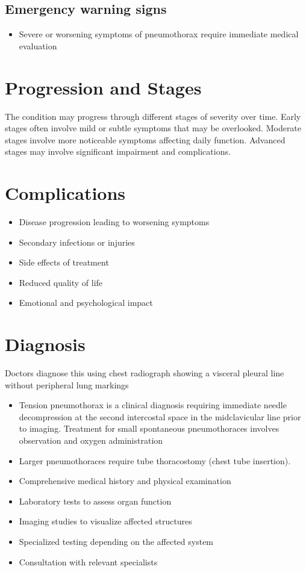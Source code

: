 \subsection{Emergency warning signs}
\begin{itemize}[noitemsep]
  \item Severe or worsening symptoms of pneumothorax require immediate medical evaluation
\end{itemize}
\section{Progression and Stages}
The condition may progress through different stages of severity over time. Early stages often involve mild or subtle symptoms that may be overlooked. Moderate stages involve more noticeable symptoms affecting daily function. Advanced stages may involve significant impairment and complications.
\section{Complications}
\begin{itemize}[noitemsep]
  \item Disease progression leading to worsening symptoms
  \item Secondary infections or injuries
  \item Side effects of treatment
  \item Reduced quality of life
  \item Emotional and psychological impact
\end{itemize}
\section{Diagnosis}
Doctors diagnose this using chest radiograph showing a visceral pleural line without peripheral lung markings

\begin{itemize}[noitemsep]
  \item Tension pneumothorax is a clinical diagnosis requiring immediate needle decompression at the second intercostal space in the midclavicular line prior to imaging. Treatment for small spontaneous pneumothoraces involves observation and oxygen administration
  \item Larger pneumothoraces require tube thoracostomy (chest tube insertion).
  \item Comprehensive medical history and physical examination
  \item Laboratory tests to assess organ function
  \item Imaging studies to visualize affected structures
  \item Specialized testing depending on the affected system
  \item Consultation with relevant specialists
\end{itemize}
